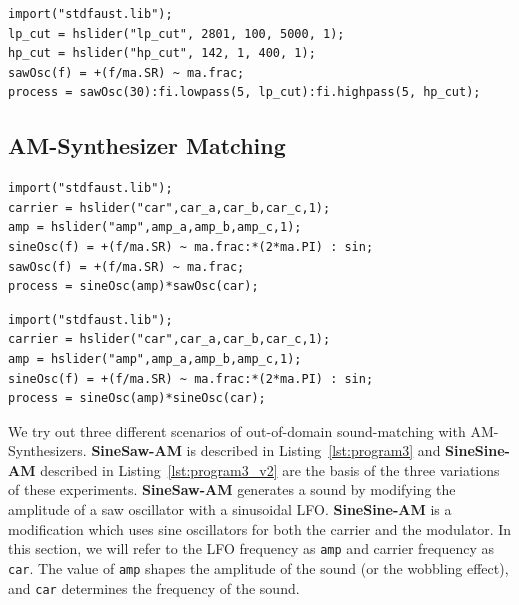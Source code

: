 \documentclass{article} %
\newcommand{\BPSaw}{\textbf{BP-Saw}\xspace}
\newcommand{\FMMod}{\textbf{SineSaw-AM}\xspace}
\newcommand{\FMModvtwo}{\textbf{SineSine-AM}\xspace}
\begin{document}
\begin{lstlisting}[caption={\BPSaw}, label={lst:program0_saw}, language=Faust,
                  float, floatplacement=!H, xleftmargin=1em, xrightmargin=0.5em, firstnumber=0, aboveskip=0em, belowskip=-1em]
import("stdfaust.lib");
lp_cut = hslider("lp_cut", 2801, 100, 5000, 1);
hp_cut = hslider("hp_cut", 142, 1, 400, 1);
sawOsc(f) = +(f/ma.SR) ~ ma.frac;
process = sawOsc(30):fi.lowpass(5, lp_cut):fi.highpass(5, hp_cut);
\end{lstlisting}


\subsection{AM-Synthesizer Matching}
\begin{lstlisting}[caption={\FMMod}, label={lst:program3},language=Faust,float,floatplacement=!H,xleftmargin=1em,xrightmargin=0.5em,firstnumber=0,aboveskip=0em, belowskip=-1em]
import("stdfaust.lib");
carrier = hslider("car",car_a,car_b,car_c,1);
amp = hslider("amp",amp_a,amp_b,amp_c,1);
sineOsc(f) = +(f/ma.SR) ~ ma.frac:*(2*ma.PI) : sin;
sawOsc(f) = +(f/ma.SR) ~ ma.frac;
process = sineOsc(amp)*sawOsc(car);
\end{lstlisting}


\begin{lstlisting}[caption={\FMModvtwo}, label={lst:program3_v2},language=Faust,float,floatplacement=!H,xleftmargin=1em,xrightmargin=0.5em,firstnumber=0,aboveskip=0em, belowskip=-1em]
import("stdfaust.lib");
carrier = hslider("car",car_a,car_b,car_c,1);
amp = hslider("amp",amp_a,amp_b,amp_c,1);
sineOsc(f) = +(f/ma.SR) ~ ma.frac:*(2*ma.PI) : sin;
process = sineOsc(amp)*sineOsc(car);
\end{lstlisting}


\label{sec:am_sound_matching}
We try out three different scenarios of out-of-domain sound-matching with AM-Synthesizers. \FMMod is described in Listing~\ref{lst:program3} and \FMModvtwo described in Listing~\ref{lst:program3_v2} are the basis of the three variations of these experiments. \FMMod generates a sound by modifying the amplitude of a saw oscillator with a sinusoidal LFO. \FMModvtwo is a modification which uses sine oscillators for both the carrier and the modulator. In this section, we will refer to the LFO frequency as \texttt{amp} and carrier frequency as \texttt{car}. The value of \texttt{amp} shapes the amplitude of the sound (or the wobbling effect), and \texttt{car} determines the frequency of the sound.
\end{document}
